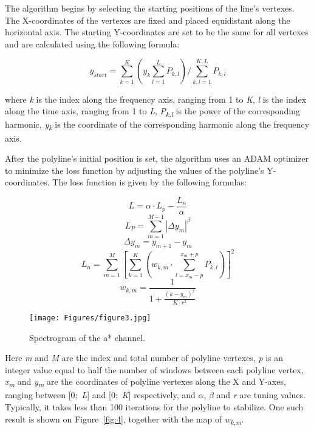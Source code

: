 The algorithm begins by selecting the starting positions of the line’s vertexes. The X-coordinates of the vertexes are fixed and placed equidistant along the horizontal axis. The starting Y-coordinates are set to be the same for all vertexes and are calculated using the following formula:

\begin{equation}
    y_{start}=\sum_{k=1}^{K}\left(y_{k}\sum_{l=1}^{L}P_{k,l}  \right)/\sum_{k,l=1}^{K,L}P_{k,l}
    \label{eq:2}
\end{equation}

where \emph{k} is the index along the frequency axis, ranging from 1 to \emph{K}, \emph{l} is the index along the time axis, ranging from 1 to \emph{L}, \emph{P\textsubscript{k,l}} is the power of the corresponding harmonic, \emph{y\textsubscript{k}} is the coordinate of the corresponding harmonic along the frequency axis.

After the polyline’s initial position is set, the algorithm uses an ADAM optimizer to minimize the loss function by adjusting the values of the polyline’s Y-coordinates. The loss function is given by the following formulas:

\begin{equation}
    L=\alpha\cdot L_{p}-\frac{L_{n}}{\alpha}
    \label{eq:3}
\end{equation}
\begin{equation}
    L_{P}=\sum_{m=1}^{M-1}\left| \Delta y_{m} \right|^{\beta}
    \label{eq:4}
\end{equation}
\begin{equation}
    \Delta y_{m}=y_{m+1}-y_{m}
    \label{eq:5}
\end{equation}
\begin{equation}
    L_{n}=\sum_{m=1}^{M}\left[ \sum_{k=1}^{K}\left( w_{k,m}\cdot \sum_{l=x_{m}-p}^{x_{m}+p}P_{k,l} \right) \right]^{2}
    \label{eq:6}
\end{equation}
\begin{equation}
    w_{k,m}=\frac{1}{1+\frac{\left( k-y_{m} \right)^{2}}{K\cdot r^{2}}}
    \label{eq:7}
\end{equation}

\begin{figure}[htbp]
    \centering
    \texttt{[image: Figures/figure3.jpg]}
    \caption{Spectrogram of the a* channel.}
    \label{fig:3}
\end{figure}

Here \emph{m} and \emph{M} are the index and total number of polyline vertexes, \emph{p} is an integer value equal to half the number of windows between each polyline vertex, \emph{x\textsubscript{m}} and \emph{y\textsubscript{m}} are the coordinates of polyline vertexes along the X and Y-axes, ranging between [0;~\emph{L}] and [0;~\emph{K}] respectively, and \emph{$\alpha$}, \emph{$\beta$} and \emph{r} are tuning values. Typically, it takes less than 100 iterations for the polyline to stabilize. One such result is shown on Figure~\ref{fig:4}, together with the map of \emph{w\textsubscript{k,m}}.

